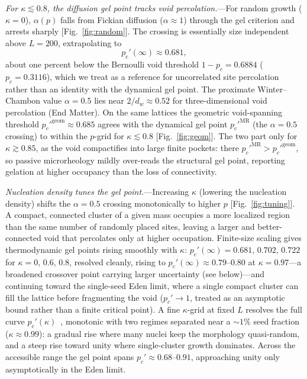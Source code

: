 \documentclass[aps,prl,twocolumn,superscriptaddress,floatfix,nofootinbib,longbibliography]{revtex4-2}
\newcommand{\pc}{p_c}
\newcommand{\pcp}{p_c'}
\newcommand{\kap}{\kappa}
\begin{document}
\emph{For $\kap\lesssim0.8$, the diffusion gel point tracks void percolation.}---For random growth ($\kap=0$), $\alpha(p)$ falls from Fickian diffusion ($\alpha\approx1$) through the gel criterion and arrests sharply [Fig.~\ref{fig:random}]. The crossing is essentially size independent above $L=200$, extrapolating to
\begin{equation}
  \pcp(\infty)\approx0.681 ,
\end{equation}
about one percent below the Bernoulli void threshold $1-\pc=0.6884$ ($\pc=0.3116$), which we treat as a reference for uncorrelated site percolation rather than an identity with the dynamical gel point. The proximate Winter--Chambon value $\alpha=0.5$ lies near $2/d_w\approx0.52$ for three-dimensional void percolation (End Matter). On the same lattices the geometric void-spanning threshold $\pcp^{\mathrm{geom}}\approx0.685$ agrees with the dynamical gel point $\pcp^{\mathrm{MR}}$ (the $\alpha=0.5$ crossing) to within the $p$-grid for $\kap\lesssim0.8$ [Fig.~\ref{fig:geom}]. The two part only for $\kap\gtrsim0.85$, as the void compactifies into large finite pockets: there $\pcp^{\mathrm{MR}}>\pcp^{\mathrm{geom}}$, so passive microrheology mildly over-reads the structural gel point, reporting gelation at higher occupancy than the loss of connectivity.

\emph{Nucleation density tunes the gel point.}---Increasing $\kap$ (lowering the nucleation density) shifts the $\alpha=0.5$ crossing monotonically to higher $p$ [Fig.~\ref{fig:tuning}]. A compact, connected cluster of a given mass occupies a more localized region than the same number of randomly placed sites, leaving a larger and better-connected void that percolates only at higher occupation. Finite-size scaling gives thermodynamic gel points rising smoothly with $\kap$: $\pcp(\infty)=0.681,\,0.702,\,0.722$ for $\kap=0,\,0.6,\,0.8$, resolved cleanly, rising to $\pcp(\infty)\approx0.79$--$0.80$ at $\kap=0.97$---a broadened crossover point carrying larger uncertainty (see below)---and continuing toward the single-seed Eden limit, where a single compact cluster can fill the lattice before fragmenting the void ($\pcp\to1$, treated as an asymptotic bound rather than a finite critical point). A fine $\kap$-grid at fixed $L$ resolves the full curve $\pcp(\kap)$~\cite{SM}, monotonic with two regimes separated near a $\sim1\%$ seed fraction ($\kap\approx0.99$): a gradual rise where many nuclei keep the morphology quasi-random, and a steep rise toward unity where single-cluster growth dominates. Across the accessible range the gel point spans $\pcp\approx0.68$--$0.91$, approaching unity only asymptotically in the Eden limit.
\end{document}
